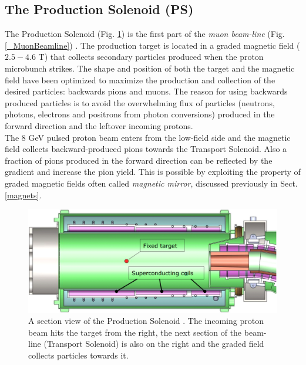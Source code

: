 \documentclass[12pt,a4paper,openright, oneside, titlepage]{book} %
\begin{document}
\subsection{The Production Solenoid (PS)}
The Production Solenoid (Fig. \ref{_PS}) is the first part of the \textit{muon beam-line} (Fig. \ref{_MuonBeamline}) \cite{PS}. 
The production target is located in a graded magnetic field ($2.5 - 4.6$ T) that collects secondary particles produced when the proton microbunch strikes. The shape and position of both the target and the magnetic field have been optimized to maximize the production and collection of the desired particles: backwards pions and muons. 
The reason for using backwards produced particles is to avoid the overwhelming flux of particles 
(neutrons, photons, electrons and positrons from photon conversions) 
produced in the forward direction and the leftover incoming protons.\\
The 8 GeV pulsed proton beam enters from the low-field side and the magnetic field collects backward-produced pions towards the Transport Solenoid. 
Also a fraction of pions produced in the forward direction can be reflected by the gradient and  increase the pion yield. 
This is possible by exploiting the property of graded magnetic fields often called \textit{magnetic mirror}, discussed previously in Sect. \ref{magnets}.

\begin{figure}[h!]
\centering
\includegraphics[scale=0.4]{PS}
\caption[Production Solenoid]{A section view of the Production Solenoid \cite{PS}. 
The incoming proton beam hits the target from the right, the next section of the beam-line (Transport Solenoid) is also on the right and the graded field collects particles towards it.}
\label{_PS}
\end{figure}
\end{document}
